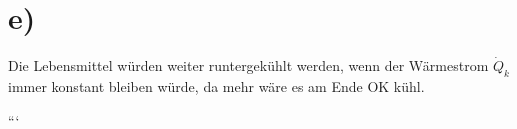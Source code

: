 

\section*{e)}

Die Lebensmittel würden weiter runtergekühlt werden, wenn der Wärmestrom \(\dot{Q}_{k}\) immer konstant bleiben würde, da mehr wäre es am Ende OK kühl.

```